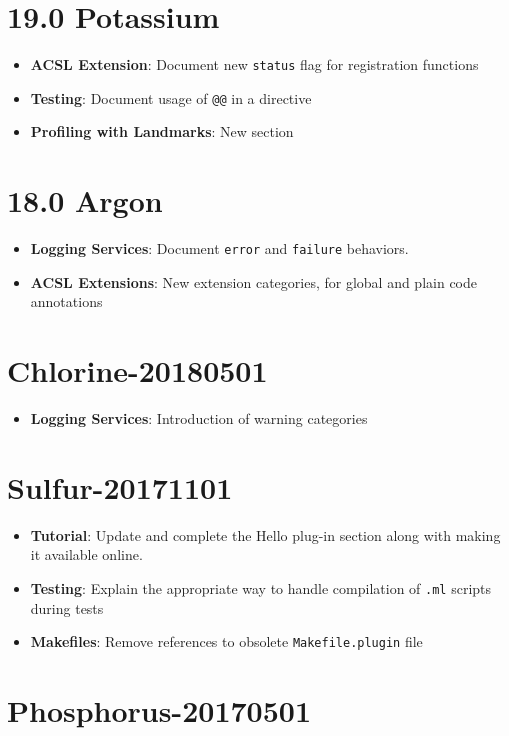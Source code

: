 \section*{19.0 Potassium}
\begin{itemize}
\item \textbf{ACSL Extension}: Document new \texttt{status} flag for registration functions
\item \textbf{Testing}: Document usage of \texttt{@@} in a directive
\item \textbf{Profiling with Landmarks}: New section
\end{itemize}

\section*{18.0 Argon}
\begin{itemize}
\item \textbf{Logging Services}: Document \texttt{error} and \texttt{failure} behaviors.
\item \textbf{ACSL Extensions}: New extension categories, for global and plain code annotations
\end{itemize}

\section*{Chlorine-20180501}

\begin{itemize}
\item \textbf{Logging Services}: Introduction of warning categories
\end{itemize}

\section*{Sulfur-20171101}
\begin{itemize}
\item \textbf{Tutorial}: Update and complete the Hello plug-in section
along with making it available online.
\item \textbf{Testing}: Explain the appropriate way to handle compilation
of \texttt{.ml} scripts during tests
\item \textbf{Makefiles}: Remove references to obsolete
\texttt{Makefile.plugin} file
\end{itemize}

\section*{Phosphorus-20170501}

